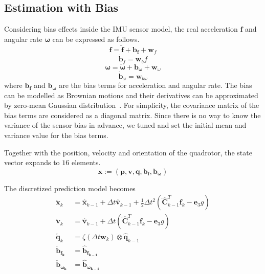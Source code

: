 \documentclass[letterpaper, 10 pt, conference]{ieeeconf}  %
\begin{document}
\subsection{Estimation with Bias}
Considering bias effects inside the IMU sensor model, the real acceleration $\bm{f}$ and angular rate $\bm{\omega}$ can be expressed as follows.
\begin{equation}
	\bm{f} = \bm{\tilde{f}}+\bm{b_{f}}+\bm{w}_f
\end{equation}
\begin{equation}
\bm{\dot{b}}_f = \bm{w}_bf
\end{equation}
\begin{equation}
	\bm{\omega} = \bm{\tilde{\omega}}+\bm{b_{\omega}}+\bm{w}_{\omega}
\end{equation}
\begin{equation}
\bm{\dot{b}}_{\omega}=\bm{w}_{b\omega}
\end{equation}
where $\bm{b_{f}}$ and $\bm{b_{\omega}}$ are the bias terms for acceleration and angular rate. The bias can be modelled as Brownian motions and their derivatives can be approximated by zero-mean Gaussian distribution~\cite{el2008analysis}. For simplicity, the covariance matrix of the bias terms are considered as a diagonal matrix. Since there is no way to know the variance of the sensor bias in advance, we tuned and set the initial mean and variance value for the bias terms.

Together with the position, velocity and orientation of the quadrotor, the state vector expands to $16$ elements.
\begin{equation}
\bm{x}:=\left( \bm{p},\bm{v},\bm{q},\bm{b_f},\bm{b_{\omega}}\right)
\end{equation}

The discretized prediction model becomes
\begin{equation}
\begin{split}
\bm{\check{x}}_k &= \bm{\hat{x}}_{k-1}+\Delta t\bm{\hat{v}}_{k-1}+\frac{1}{2}\Delta t^2\left(\bm{\hat{C}}_{k-1}^T \bm{f}_k-\bm{e}_3g\right) \\
\bm{\check{v}}_k &= \bm{\hat{v}}_{k-1}+\Delta t\left(\bm{\hat{C}}_{k-1}^T \bm{f}_k-\bm{e}_3 g\right) \\
\bm{\check{q}}_k &= \zeta\left(\Delta t \bm{w}_k\right)\otimes \bm{\hat{q}}_{k-1}  \\
\bm{\check{b}_{f_{k}}} &= \bm{\hat{b}_{f_{k-1}}}   \\
\bm{\check{b}_{\omega_{k}}} &= \bm{\hat{b}_{\omega_{k-1}}}
\end{split}
\end{equation}
\end{document}
